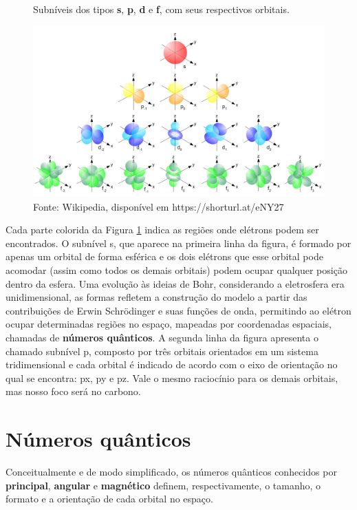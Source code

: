 \begin{figure}[h]
\centering
\vspace{0.25cm}
\caption{Subníveis dos tipos \textbf{s}, \textbf{p}, \textbf{d} e \textbf{f}, com seus respectivos orbitais.}
\label{fig:orbitais}
\includegraphics[width=1\linewidth]{imagens/all_orbitals.jpg}
\caption*{Fonte: Wikipedia, disponível em https://shorturl.at/eNY27}
\end{figure}

Cada parte colorida da Figura \ref{fig:orbitais} indica as regiões onde elétrons podem ser encontrados. O subnível s, que aparece na primeira linha da figura, é formado por apenas um orbital de forma esférica e os dois elétrons que esse orbital pode acomodar (assim como todos os demais orbitais) podem ocupar qualquer posição dentro da esfera. Uma evolução às ideias de Bohr, considerando a eletrosfera era unidimensional, as formas refletem a construção do modelo a partir das contribuições de Erwin Schrödinger e suas funções de onda, permitindo ao elétron ocupar determinadas regiões no espaço, mapeadas por coordenadas espaciais, chamadas de \textbf{números quânticos}. A segunda linha da figura apresenta o chamado subnível p, composto por três orbitais orientados em um sistema tridimensional e cada orbital é indicado de acordo com o eixo de orientação no qual se encontra: px, py e pz. Vale o mesmo raciocínio para os demais orbitais, mas nosso foco será no carbono.

\section{Números quânticos}
Conceitualmente e de modo simplificado, os números quânticos conhecidos por \textbf{principal}, \textbf{angular} e \textbf{magnético} definem, respectivamente, o tamanho, o formato e a orientação de cada orbital no espaço. 

